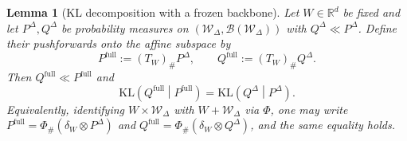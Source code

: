 \documentclass{article} %
\newtheorem{lemma}{Lemma}
\begin{document}




\begin{lemma}[KL decomposition with a frozen backbone]
\label{equation: subspace-full}
Let $W\in\mathbb R^d$ be fixed and let $P^{\Delta},Q^{\Delta}$ be probability measures on $(\mathcal W_\Delta,\mathcal B(\mathcal W_\Delta))$ with $Q^{\Delta}\ll P^{\Delta}$. Define their pushforwards onto the affine subspace by
\[
P^{\mathrm{full}}:=(T_W)_{\text{\#}} P^{\Delta},\qquad
Q^{\mathrm{full}}:=(T_W)_{\text{\#}} Q^{\Delta}.
\]
Then $Q^{\mathrm{full}}\ll P^{\mathrm{full}}$ and
\[
\mathrm{KL}\left(Q^{\mathrm{full}}\middle|P^{\mathrm{full}}\right)
=\mathrm{KL}\left(Q^{\Delta}\middle|P^{\Delta}\right).
\]
Equivalently, identifying ${W}\times\mathcal W_\Delta$ with $W+\mathcal W_\Delta$ via $\Phi$, one may write
$P^{\mathrm{full}}=\Phi_{\text{\#}}(\delta_W\otimes P^{\Delta})$ and
$Q^{\mathrm{full}}=\Phi_{\text{\#}}(\delta_W\otimes Q^{\Delta})$, and the same equality holds.
\end{lemma}
\end{document}
